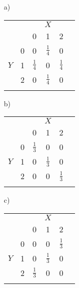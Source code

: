 \documentclass[twoside]{article}
\begin{document}
\begin{minipage}[t]{0.48\textwidth}
\begin{enumerate}
	\item[a)]
		\begin{tabular}{|cc|ccc|c|}\hline
				&		&	&$X$			&				&\\
				&		&0	&1				&2				&\\\hline
				&0	{}	&0				&$\frac{1}{4}$	&0				&\\
			$Y$	&1	{}	&$\frac{1}{4}$	&0				&$\frac{1}{4}$	&\\
				&2	{}	&0				&$\frac{1}{4}$	&0				&\\\hline
				&	{}	&				&				&				&\\\hline
		\end{tabular}
	\item[b)]
		\begin{tabular}{|cc|ccc|c|}\hline
				&		&	&$X$			&				&\\
				&		&0	&1				&2				&\\\hline
				&0	{}	&$\frac{1}{3}$	&0				&0				&\\
			$Y$	&1	{}	&0				&$\frac{1}{3}$	&0				&\\
				&2	{}	&0				&0				&$\frac{1}{3}$	&\\\hline
				&	{}	&				&				&				&\\\hline
		\end{tabular}
	\item[c)]
		\begin{tabular}{|cc|ccc|c|}\hline
				&		&	&$X$			&				&\\
				&		&0	&1				&2				&\\\hline
				&0	{}	&0				&0				&$\frac{1}{3}$	&\\
			$Y$	&1	{}	&0				&$\frac{1}{3}$	&0				&\\
				&2	{}	&$\frac{1}{3}$	&0				&0				&\\\hline
				&	{}	&				&				&				&\\\hline
		\end{tabular}
\end{enumerate}
\end{minipage} ~~
\end{document}
